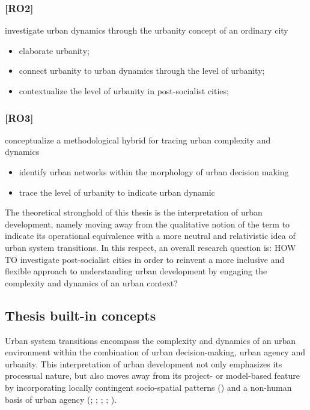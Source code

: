\documentclass[11pt]{report}
\begin{document}
{{\subsubsection{[RO2]}
investigate urban dynamics through the urbanity concept of an ordinary city
\begin{itemize}
\item elaborate urbanity;
\item connect urbanity to urban dynamics through the level of urbanity;
\item contextualize the level of urbanity in post-socialist cities;
\end{itemize}

\subsubsection{[RO3]}
conceptualize a methodological hybrid for tracing urban complexity and dynamics
\begin{itemize}
\item identify urban networks within the morphology of urban decision making
\item trace the level of urbanity to indicate urban dynamic
\end{itemize}

The theoretical stronghold of this thesis is the interpretation  of  urban  development,  namely  moving  away  from the qualitative  notion of the term to indicate  its  operational  equivalence  with  a more  neutral  and  relativistic idea of urban system transitions.
In this respect, an overall research question is: HOW TO investigate  post-socialist cities in order to reinvent a more inclusive and flexible approach to understanding urban development by engaging the complexity and dynamics of an urban context?

\subsection{Thesis built-in concepts}

Urban system transitions encompass the complexity and dynamics of an urban environment within the combination of urban decision-making, urban agency and urbanity.
This interpretation of urban development not only emphasizes its processual nature, but also moves away from its project- or model-based feature by incorporating locally contingent socio-spatial patterns (\href{ref}{\citealt{guy_understanding_2000}}) and a non-human basis of urban agency (\href{ref}{\citealt{healey_planners_1992}}; \citealt{mcfarlane_assemblage_2011}; \citealt{anderson_assemblage_2011};
\cite{healey_circuits_2013}; \citealt{rafiee_relationship_2014}).
\\

}}
\end{document}
